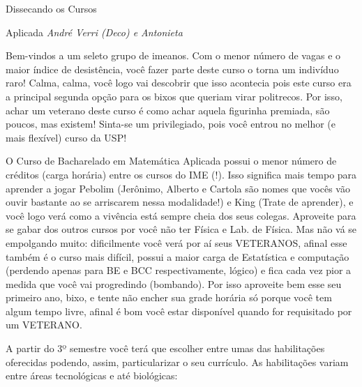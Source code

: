 \begin{secao}{Dissecando os Cursos}
\clearpage

\begin{subsecao}{Aplicada}
{\em André Verri (Deco) e Antonieta}

Bem-vindos a um seleto grupo de imeanos. Com o menor número de vagas e o maior índice de desistência, você fazer parte deste curso o torna um indivíduo raro! Calma, calma, você logo vai descobrir que isso acontecia pois este curso era a principal segunda opção para os bixos que queriam virar politrecos. Por isso, achar um veterano deste curso é como achar aquela figurinha premiada, são poucos, mas existem! Sinta-se um privilegiado, pois você entrou no melhor (e mais flexível) curso da USP! 

O Curso de Bacharelado em Matemática Aplicada possui o menor número de créditos (carga horária) entre os cursos do IME (!). Isso significa mais tempo para aprender a jogar Pebolim (Jerônimo, Alberto e Cartola são nomes que vocês vão ouvir bastante ao se arriscarem nessa modalidade!) e King (Trate de aprender), e você logo verá como a vivência está sempre cheia dos seus colegas. Aproveite para se gabar dos outros cursos por você não ter Física e Lab. de Física. Mas não vá se empolgando muito: dificilmente você verá por aí seus VETERANOS, afinal esse também é o curso mais difícil, possui a maior carga de Estatística e computação (perdendo apenas para BE e BCC respectivamente, lógico) e fica cada vez pior a medida que você vai progredindo (bombando). Por isso aproveite bem esse seu primeiro ano, bixo, e tente não encher sua grade horária só porque você tem algum tempo livre, afinal é bom você estar disponível quando for requisitado por um VETERANO.

A partir do 3º semestre você terá que escolher entre umas das habilitações oferecidas podendo, assim, particularizar o seu currículo. As habilitações variam entre áreas tecnológicas e até biológicas:
\begin{description}


\end{description}
\end{subsecao}
\end{secao}
